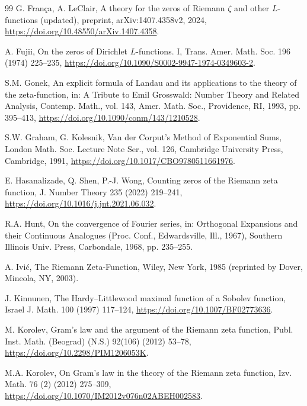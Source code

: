 \documentclass[preprint,12pt]{elsarticle}
\numberwithin{equation}{section}
\theoremstyle{plain}
\theoremstyle{definition}
\theoremstyle{remark}
\begin{document}
\begin{thebibliography}{99}
G. Fran\c{c}a, A. LeClair, A theory for the zeros of Riemann $\zeta$ and other $L$-functions (updated), preprint, arXiv:1407.4358v2, 2024, \href{https://doi.org/10.48550/arXiv.1407.4358}{https://doi.org/10.48550/arXiv.1407.4358}.

A. Fujii, On the zeros of Dirichlet $L$-functions. I, Trans. Amer. Math. Soc. 196 (1974) 225--235, \href{https://doi.org/10.1090/S0002-9947-1974-0349603-2}{https://doi.org/10.1090/S0002-9947-1974-0349603-2}.

S.M. Gonek, An explicit formula of Landau and its applications to the theory of the zeta-function, in: A Tribute to Emil Grosswald: Number Theory and Related Analysis, Contemp. Math., vol. 143, Amer. Math. Soc., Providence, RI, 1993, pp. 395--413, \href{https://doi.org/10.1090/conm/143/1210528}{https://doi.org/10.1090/conm/143/1210528}.

S.W. Graham, G. Kolesnik, Van der Corput's Method of Exponential Sums, London Math. Soc. Lecture Note Ser., vol. 126, Cambridge University Press, Cambridge, 1991, \href{https://doi.org/10.1017/CBO9780511661976}{https://doi.org/10.1017/CBO9780511661976}.

E. Hasanalizade, Q. Shen, P.-J. Wong, Counting zeros of the Riemann zeta function, J. Number Theory 235 (2022) 219--241, \href{https://doi.org/10.1016/j.jnt.2021.06.032}{https://doi.org/10.1016/j.jnt.2021.06.032}.

R.A. Hunt, On the convergence of Fourier series, in: Orthogonal Expansions and their Continuous Analogues (Proc. Conf., Edwardsville, Ill., 1967), Southern Illinois Univ. Press, Carbondale, 1968, pp. 235--255.

A. Ivi\'c, The Riemann Zeta-Function, Wiley, New York, 1985 (reprinted by Dover, Mineola, NY, 2003).

J. Kinnunen, The Hardy--Littlewood maximal function of a Sobolev function, Israel J. Math. 100 (1997) 117--124, \href{https://doi.org/10.1007/BF02773636}{https://doi.org/10.1007/BF02773636}.

M. Korolev, Gram's law and the argument of the Riemann zeta function, Publ. Inst. Math. (Beograd) (N.S.) 92(106) (2012) 53--78, \href{https://doi.org/10.2298/PIM1206053K}{https://doi.org/10.2298/PIM1206053K}.

M.A. Korolev, On Gram's law in the theory of the Riemann zeta function, Izv. Math. 76 (2) (2012) 275--309, \href{https://doi.org/10.1070/IM2012v076n02ABEH002583}{https://doi.org/10.1070/IM2012v076n02ABEH002583}.


\end{thebibliography}
\end{document}
